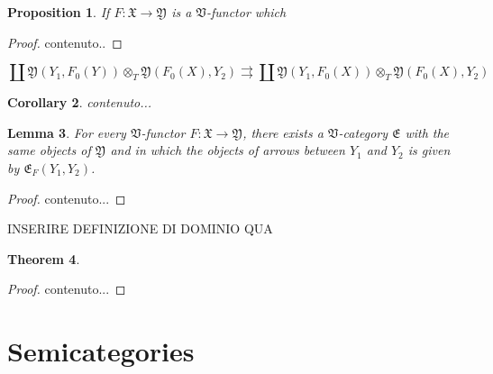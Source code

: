 \documentclass[12pt]{article}
\newtheorem{lemma}{Lemma}[section]
\newtheorem{proposition}[lemma]{Proposition}
\newtheorem{theorem}[lemma]{Theorem}
\newtheorem{corollary}[lemma]{Corollary}
\theoremstyle{definition}
\def\X{\mathfrak X}
\def\V{\mathfrak V}
\def\Y{\mathfrak Y}
\numberwithin{equation}{section}
\def\e{\mathfrak{E}}
\begin{document}
\begin{proposition}\label{prop:comp}
	If $F:\X \to \Y$ is a $\V$-functor which 
	
	
 \end{proposition}
\begin{proof}
	contenuto..
\end{proof}



\[\coprod \Y(Y_1, F_0(Y)) \otimes_T \Y(F_0(X), Y_2) \rightrightarrows  \coprod \Y(Y_1, F_0(X)) \otimes_T \Y(F_0(X), Y_2)  \]

\begin{corollary}\label{cor:comp}
	contenuto...
\end{corollary}

\begin{lemma}\label{lem:category}
	For every $\V$-functor $F:\X\to \Y$, there exists a $\V$-category $\e$ with the same objects of $\Y$ and in which the objects of arrows between $Y_1$ and $Y_2$ is given by $\e_F(Y_1, Y_2)$.
\end{lemma}
\begin{proof}
	contenuto...
\end{proof}



INSERIRE DEFINIZIONE DI DOMINIO QUA

\begin{theorem}\label{thm:mitch}
	
\end{theorem}
\begin{proof}
	contenuto...
\end{proof}

\section{Semicategories}
\end{document}
